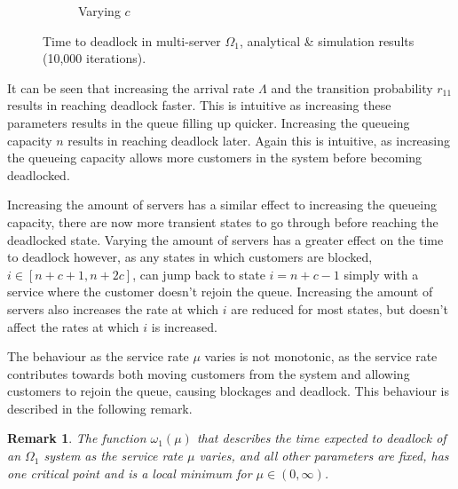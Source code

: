 \documentclass{article}
\newtheorem{remark}{Remark}
\numberwithin{equation}{section}
\begin{document}
\begin{figure}[!htbp]
\begin{center}
\begin{subfigure}[b]{0.48\textwidth}
    \caption{Varying $c$}
    \label{fig:1Nms_c}
  \end{subfigure}
  \end{center}
  \caption{Time to deadlock in multi-server $\Omega_1$, analytical \&
  simulation results (10,000 iterations).}
  \label{fig:timestodeadlock1nodemultiserver}
\end{figure}

It can be seen that increasing the arrival rate $\Lambda$ and the transition
probability $r_{11}$ results in reaching deadlock faster.
This is intuitive as increasing these parameters results in the queue filling
up quicker.
Increasing the queueing capacity $n$ results in reaching deadlock later.
Again this is intuitive, as increasing the queueing capacity allows more
customers in the system before becoming deadlocked.

Increasing the amount of servers has a similar effect to increasing the
queueing capacity, there are now more transient states to go through before
reaching the deadlocked state.
Varying the amount of servers has a greater effect on the time to deadlock
however, as any states in which customers are blocked, $i \in [n+c+1, n+2c]$,
can jump back to state $i=n+c-1$ simply with a service where the customer
doesn't rejoin the queue.
Increasing the amount of servers also increases the rate at which $i$ are
reduced for most states, but doesn't affect the rates at which $i$ is
increased.

The behaviour as the service rate $\mu$ varies is not monotonic, as the
service rate contributes towards both moving customers from the system and
allowing customers to rejoin the queue, causing blockages and deadlock.
This behaviour is described in the following remark.\\

\begin{remark}\label{rem:oneminima}
The function $\omega_1(\mu)$ that describes the time expected to deadlock of
an $\Omega_1$ system as the service rate $\mu$ varies, and all other
parameters are fixed, has one critical point and is a local minimum for
$\mu \in (0, \infty)$.
\end{remark}
\end{document}
